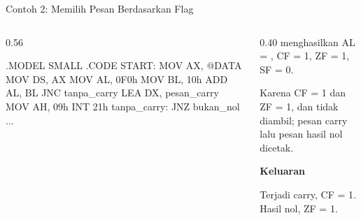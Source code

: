 \documentclass[aspectratio=169,11pt]{beamer}
\begin{document}
\begin{frame}[fragile]{Contoh 2: Memilih Pesan Berdasarkan Flag}
\begin{columns}[t]
\begin{column}{0.56\textwidth}
\begin{kodeasm}
.MODEL SMALL
.CODE
START:
    MOV AX, @DATA
    MOV DS, AX
    MOV AL, 0F0h
    MOV BL, 10h
    ADD AL, BL
    JNC tanpa_carry
    LEA DX, pesan_carry
    MOV AH, 09h
    INT 21h
tanpa_carry:
    JNZ bukan_nol
...
\end{kodeasm}
\end{column}
\begin{column}{0.40\textwidth}
\footnotesize
{} menghasilkan AL = , CF = 1, ZF = 1,
SF = 0.

\vspace{0.25em}
Karena CF = 1 dan ZF = 1,  dan  tidak diambil;
pesan carry lalu pesan hasil nol dicetak.

\vspace{0.25em}
{\color{obeTeal}\bfseries Keluaran}\\[0.15em]
\begin{keluaran}
Terjadi carry, CF = 1.
Hasil nol, ZF = 1.
\end{keluaran}
\end{column}
\end{columns}
\end{frame}
\end{document}
